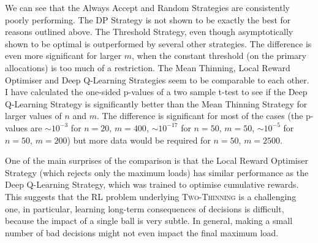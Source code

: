 We can see that the Always Accept and Random Strategies are consistently poorly performing. The DP Strategy is not shown to be exactly the best for reasons outlined above. The Threshold Strategy, even though asymptotically shown to be optimal is outperformed by several other strategies. The difference is even more significant for larger $m$, when the constant threshold (on the primary allocations) is too much of a restriction. The Mean Thinning, Local Reward Optimiser and Deep Q-Learning Strategies seem to be comparable to each other. I have calculated the one-sided p-values of a two sample t-test to see if the Deep Q-Learning Strategy is significantly better than the Mean Thinning Strategy for larger values of $n$ and $m$. The difference is significant for most of the cases (the p-values are $\sim 10^{-3}$ for $n=20$, $m=400$, $\sim 10^{-17}$ for $n=50$, $m=50$, $\sim 10^{-5}$ for $n=50$, $m=200$) but more data would be required for $n=50$, $m=2500$.  



One of the main surprises of the comparison is that the Local Reward Optimiser Strategy (which rejects only the maximum loads) has similar performance as the Deep Q-Learning Strategy, which was trained to optimise cumulative rewards. This suggests that the RL problem underlying \textsc{Two-Thinning} is a challenging one, in particular, learning long-term consequences of decisions is difficult, because the impact of a single ball is very subtle. In general, making a small number of bad decisions might not even impact the final maximum load. 







